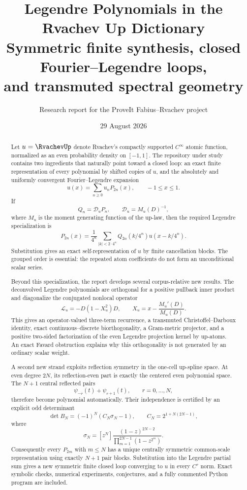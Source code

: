 \documentclass[11pt,oneside]{article}
\title{\textbf{Legendre Polynomials in the Rvachev Up Dictionary}\\[0.4em]
\large Symmetric finite synthesis, closed Fourier--Legendre loops,\\
and transmuted spectral geometry}
\author{Research report for the ProveIt Fabius--Rvachev project}
\date{29 August 2026}
\numberwithin{equation}{section}
\theoremstyle{definition}
\theoremstyle{remark}
\newcommand{\M}{M_u}
\newcommand{\Dscr}{\mathscr D_u}
\newcommand{\Lscr}{\mathscr L_u}
\begin{document}
\maketitle

\begin{abstract}
Let $u=\RvachevUp$ denote Rvachev's compactly supported $C^\infty$ atomic function,
normalized as an even probability density on $[-1,1]$.  The repository under
study contains two ingredients that naturally point toward a closed loop: an
exact finite representation of every polynomial by shifted copies of $u$, and
the absolutely and uniformly convergent Fourier--Legendre expansion
\[
  u(x)=\sum_{n\ge0}u_nP_{2n}(x),\qquad -1\le x\le1.
\]
If
\[
  Q_n=\Dscr P_n,\qquad \Dscr=\M(D)^{-1},
\]
where $\M$ is the moment generating function of the up-law, then the required
Legendre specialization is
\[
 P_{2n}(x)=\frac1{4^n}\sum_{|k|<2\cdot4^n}
 Q_{2n}(k/4^n)u(x-k/4^n).
\]
Substitution gives an exact self-representation of $u$ by finite cancellation
blocks.  The grouped order is essential: the repeated atom coefficients do not
form an unconditional scalar series.

Beyond this specialization, the report develops several corpus-relative new
results.  The deconvolved Legendre polynomials are orthogonal for a positive
pullback inner product and diagonalize the conjugated nonlocal operator
\[
 \Lscr=-D(1-X_u^2)D,\qquad
 X_u=x-\frac{\M'(D)}{\M(D)}.
\]
This gives an operator-valued three-term recurrence, a transmuted
Christoffel--Darboux identity, exact continuous--discrete biorthogonality, a
Gram-metric projector, and a positive two-sided factorization of the even
Legendre projection kernel by up-atoms.  An exact Favard obstruction explains
why this orthogonality is not generated by an ordinary scalar weight.

A second new strand exploits reflection symmetry in the one-cell up-spline
space.  At even degree $2N$, its reflection-even part is exactly the centered
even polynomial space.  The $N+1$ central reflected pairs
\[
 \psi_{-r}(t)+\psi_{r+1}(t),\qquad r=0,\ldots,N,
\]
therefore become polynomial automatically.  Their independence is certified by
an explicit odd determinant
\[
 \det B_N=(-1)^N(C_N\sigma_N-1),\qquad
 C_N=2^{1+N(2N-1)},
\]
where
\[
 \sigma_N=[z^N]\frac{(1-z)^{2N-2}}
 {\prod_{m=1}^{2N-1}(1-z^{2^m})}.
\]
Consequently every $P_{2m}$ with $m\le N$ has a unique centrally symmetric
common-scale representation using exactly $N+1$ pair blocks.  Substitution into
the Legendre partial sum gives a new symmetric finite closed loop converging to
$u$ in every $C^r$ norm.  Exact symbolic checks, numerical experiments,
conjectures, and a fully commented Python program are included.
\end{abstract}
\end{document}
